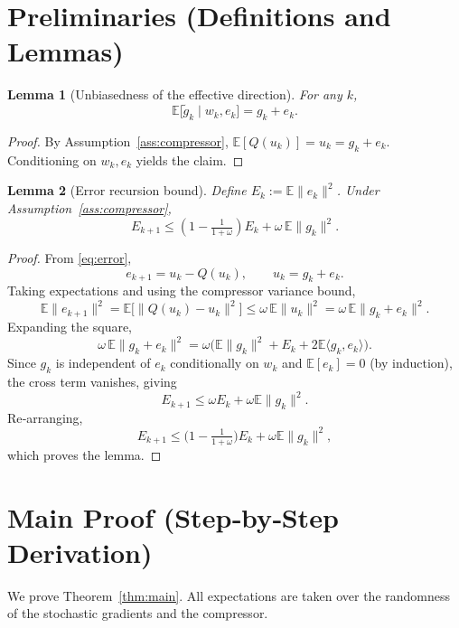 \documentclass{article}
\newtheorem{lemma}{Lemma}
\newcommand{\E}{\mathbb{E}}
\begin{document}
\section*{Preliminaries (Definitions and Lemmas)}
\begin{lemma}[Unbiasedness of the effective direction]\label{lem:unbiased}
For any $k$,
\[
\E\big[\tilde g_{k}\mid w_{k},e_{k}\big]=g_{k}+e_{k}.
\]
\end{lemma}
\begin{proof}
By Assumption~\ref{ass:compressor}, $\E[Q(u_{k})]=u_{k}=g_{k}+e_{k}$.  Conditioning on $w_{k},e_{k}$ yields the claim. \qedhere
\end{proof}

\begin{lemma}[Error recursion bound]\label{lem:error}
Define $E_{k}:=\E\|e_{k}\|^{2}$.  Under Assumption~\ref{ass:compressor},
\[
E_{k+1}\le (1-\tfrac{1}{1+\omega})E_{k}+\omega\,\E\|g_{k}\|^{2}.
\]
\end{lemma}
\begin{proof}
From \eqref{eq:error},
\[
e_{k+1}=u_{k}-Q(u_{k}),\qquad u_{k}=g_{k}+e_{k}.
\]
Taking expectations and using the compressor variance bound,
\[
\E\|e_{k+1}\|^{2}
 =\E\big[\|Q(u_{k})-u_{k}\|^{2}\big]
 \le \omega\,\E\|u_{k}\|^{2}
 =\omega\,\E\|g_{k}+e_{k}\|^{2}.
\]
Expanding the square,
\[
\omega\,\E\|g_{k}+e_{k}\|^{2}
 =\omega\big(\E\|g_{k}\|^{2}+E_{k}+2\E\langle g_{k},e_{k}\rangle\big).
\]
Since $g_{k}$ is independent of $e_{k}$ conditionally on $w_{k}$ and $\E[e_{k}]=0$ (by induction), the cross term vanishes, giving
\[
E_{k+1}\le\omega E_{k}+\omega\E\|g_{k}\|^{2}.
\]
Re‑arranging,
\[
E_{k+1}\le\big(1-\tfrac{1}{1+\omega}\big)E_{k}+\omega\E\|g_{k}\|^{2},
\]
which proves the lemma. \qedhere
\end{proof}

\section*{Main Proof (Step‑by‑Step Derivation)}
We prove Theorem~\ref{thm:main}.  All expectations are taken over the randomness of the stochastic gradients and the compressor.
\end{document}
